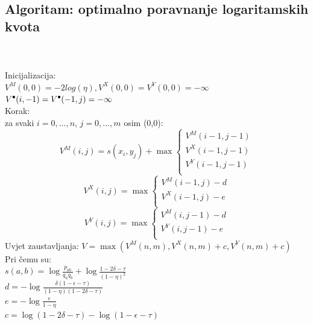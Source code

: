 \documentclass[a4paper]{article}
\newcommand\tab[1][1cm]{\hspace*{#1}}
\newcommand\sbullet[1][.5]{\mathbin{\vcenter{\hbox{\scalebox{#1}{$\bullet$}}}}}
\begin{document}
\noindent
\\
\subsection{Algoritam: optimalno poravnanje logaritamskih kvota \cite{hmm_algorithms}}  \\
\\
Inicijalizacija: \\
\tab \tab $V^M(0,0) = - 2 log(\eta), V^X(0,0) = V^Y(0,0) = -\infty$\\
\tab \tab $V^{\sbullet[.75]}(i,-1) = V^{\sbullet[.75]}(-1,j) = -\infty$\\
Korak:\\
\tab za svaki $i=0,...,n$, $j=0,...,m$ osim (0,0):\\
\begin{equation}
     V^M(i,j) = s(x_i,y_j) + \max
    \begin{cases}
      V^M(i-1,j-1)\\
      V^X(i-1,j-1)\\
      V^Y(i-1,j-1)\\          
    \end{cases}
\end{equation}
\begin{equation}
     V^X(i,j) = \max
    \begin{cases}
      V^M(i-1,j) - d\\
      V^X(i-1,j) - e\\
    \end{cases}   
\end{equation}
\begin{equation}
     V^Y(i,j) = \max
    \begin{cases}
      V^M(i,j-1) -d\\
      V^Y(i,j-1) - e\\         
    \end{cases}
\end{equation}
Uvjet zaustavljanja:
$V = \max(V^M(n,m), V^X(n,m) + c , V^Y(n,m) + c )$ \\
Pri čemu su:\\
	\tab$s(a,b) = \log\frac{p_{ab}}{q_a q_b} + \log\frac{1 - 2\delta - \tau }{(1-\eta)^2}$\\
    \tab$d = -\log\frac{\delta(1-\epsilon - \tau)}{(1-\eta)(1-2\delta - \tau)}$\\
    \tab$e = -\log\frac{\epsilon}{1-\eta}$\\
	\tab$c = \log( 1 - 2\delta - \tau) - \log(1-\epsilon - \tau)$
	
\end{document}
